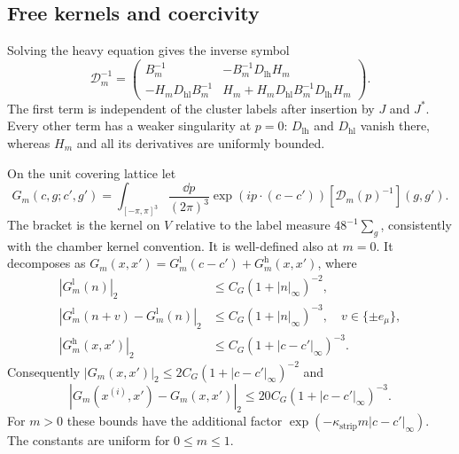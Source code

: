 \subsection{Free kernels and coercivity}\label{subsec:free-kernels}

Solving the heavy equation gives the inverse symbol
\begin{equation}\label{eq:inverse-symbol-blocks}
 \mathcal D_m^{-1}=
 \begin{pmatrix}
 B_m^{-1}&-B_m^{-1}D_{\mathrm{lh}}H_m\\
 -H_mD_{\mathrm{hl}}B_m^{-1}&
 H_m+H_mD_{\mathrm{hl}}B_m^{-1}D_{\mathrm{lh}}H_m
 \end{pmatrix}.
\end{equation}
The first term is independent of the cluster labels after insertion by
$J$ and $J^*$. Every other term has a weaker singularity at $p=0$:
$D_{\mathrm{lh}}$ and $D_{\mathrm{hl}}$ vanish there, whereas $H_m$
and all its derivatives are uniformly bounded.

\begin{proposition}\label{prop:free-chamber-kernel}
On the unit covering lattice let
\[
 G_m(c,g;c',g')=\int_{[-\pi,\pi]^3}\frac{\dd p}{(2\pi)^3}
       \exp(ip\cdot(c-c'))[\mathcal D_m(p)^{-1}](g,g').
\]
The bracket is the kernel on $V$ relative to the label measure
$48^{-1}\sum_g$, consistently with the chamber kernel convention.
It is well-defined also at $m=0$. It decomposes as
$G_m(x,x')=G_m^{\mathrm l}(c-c')+G_m^{\mathrm h}(x,x')$, where
\begin{align}
 |G_m^{\mathrm l}(n)|_2&\le C_G(1+|n|_\infty)^{-2},\label{eq:free-light}\\
 |G_m^{\mathrm l}(n+v)-G_m^{\mathrm l}(n)|_2
       &\le C_G(1+|n|_\infty)^{-3},\quad v\in\{\pm e_\mu\},\\
 |G_m^{\mathrm h}(x,x')|_2&\le C_G(1+|c-c'|_\infty)^{-3}.
\end{align}
Consequently $|G_m(x,x')|_2\le2C_G(1+|c-c'|_\infty)^{-2}$ and
\begin{equation}\label{eq:free-bond-difference}
 |G_m(x^{(i)},x')-G_m(x,x')|_2
       \le20C_G(1+|c-c'|_\infty)^{-3}.
\end{equation}
For $m>0$ these bounds have the additional factor
$\exp(-\kappa_{\mathrm{strip}}m|c-c'|_\infty)$. The constants are uniform for
$0\le m\le1$.
\end{proposition}

